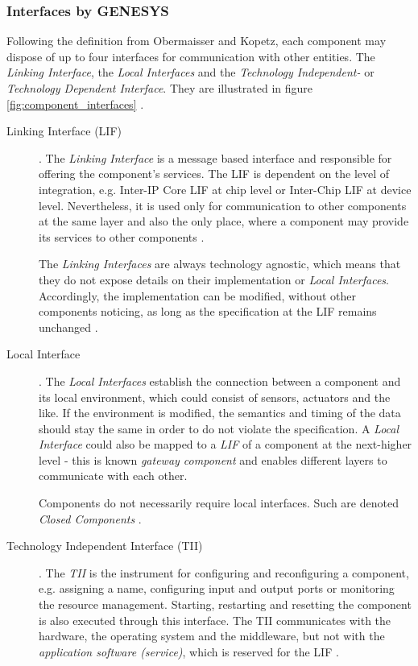 \subsubsection{Interfaces by GENESYS}
Following the definition from Obermaisser and Kopetz, each component may dispose of up to four interfaces for communication with other entities. The \emph{Linking Interface}, the \emph{Local Interfaces} and the \emph{Technology Independent-} or \emph{Technology Dependent Interface}. They are illustrated in figure \ref{fig:component_interfaces} \cite[p.40-41]{genesys}.

\begin{description}
\item [Linking Interface (LIF)]. 
The \emph{Linking Interface} is a message based interface and responsible for offering the component's services. The LIF is dependent on the level of integration, e.g. Inter-IP Core LIF at chip level or Inter-Chip LIF at device level. Nevertheless, it is used only for communication to other components at the same layer and also the only place, where a component may provide its services to other components \cite[p.9]{genesys}.

The \emph{Linking Interfaces} are always technology agnostic, which means that they do not expose details on their implementation or \emph{Local Interfaces}. Accordingly, the implementation can be modified, without other components noticing, as long as the specification at the LIF remains unchanged \cite[p.9, 40-41]{genesys}.

\item [Local Interface]. 
The \emph{Local Interfaces} establish the connection between a component and its local environment, which could consist of sensors, actuators and the like. If the environment is modified, the semantics and timing of the data should stay the same in order to do not violate the specification. A \emph{Local Interface} could also be mapped to a \emph{LIF} of a component at the next-higher level - this is known \emph{gateway component} and enables different layers to communicate with each other.

Components do not necessarily require local interfaces. Such are denoted \emph{Closed Components} \cite[p.40-41]{genesys}.

\item [Technology Independent Interface (TII)].
The \emph{TII} is the instrument for configuring and reconfiguring a component, e.g. assigning a name, configuring input and output ports or monitoring the resource management. Starting, restarting and resetting the component is also executed through this interface. The TII communicates with the hardware, the operating system and the middleware, but not with the \emph{application software (service)}, which is reserved for the LIF \cite[p.40-41]{genesys}.


\end{description}
